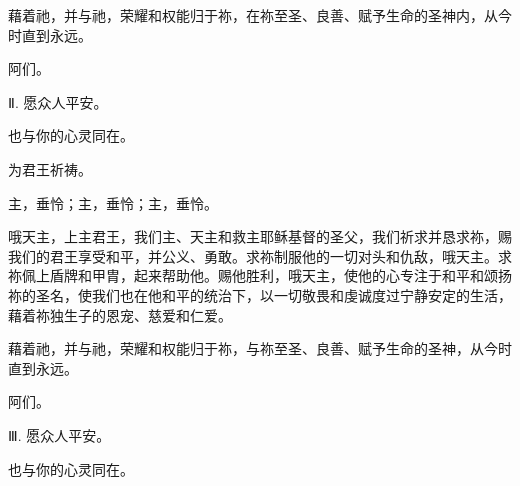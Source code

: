 \par

藉着祂，并与祂，荣耀和权能归于祢，在祢至圣、良善、赋予生命的圣神内，从今时直到永远。\par

\par

阿们。\par

\par

Ⅱ. 愿众人平安。\par

\par

也与你的心灵同在。\par

\par

为君王祈祷。\par

\par

主，垂怜；主，垂怜；主，垂怜。\par

\par

哦天主，上主君王，我们主、天主和救主耶稣基督的圣父，我们祈求并恳求祢，赐我们的君王享受和平，并公义、勇敢。求祢制服他的一切对头和仇敌，哦天主。求祢佩上盾牌和甲胄，起来帮助他。赐他胜利，哦天主，使他的心专注于和平和颂扬祢的圣名，使我们也在他和平的统治下，以一切敬畏和虔诚度过宁静安定的生活，藉着祢独生子的恩宠、慈爱和仁爱。\par

\par

藉着祂，并与祂，荣耀和权能归于祢，与祢至圣、良善、赋予生命的圣神，从今时直到永远。\par

\par

阿们。\par

\par

Ⅲ. 愿众人平安。\par

\par

也与你的心灵同在。\par

